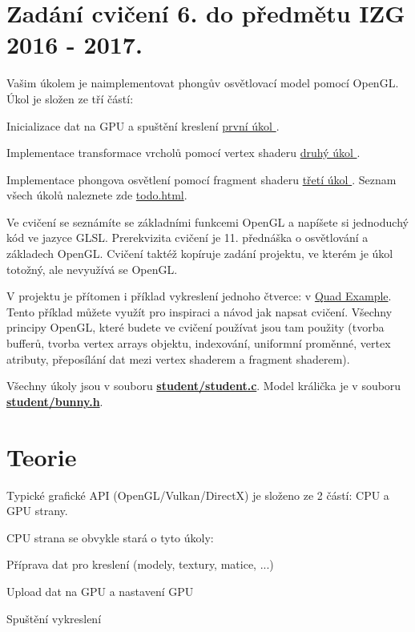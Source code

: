 \hypertarget{index_zadani}{}\section{Zadání cvičení 6. do předmětu I\-Z\-G 2016 -\/ 2017.}\label{index_zadani}
Vašim úkolem je naimplementovat phongův osvětlovací model pomocí Open\-G\-L. Úkol je složen ze tří částí\-:
\begin{DoxyItemize}
\item Inicializace dat na G\-P\-U a spuštění kreslení \hyperlink{group__task1}{první úkol }. 
\item Implementace transformace vrcholů pomocí vertex shaderu \hyperlink{group__task2}{druhý úkol }. 
\item Implementace phongova osvětlení pomocí fragment shaderu \hyperlink{group__task3}{třetí úkol }.  Seznam všech úkolů naleznete zde \hyperlink{todo}{todo.\-html}.
\end{DoxyItemize}

Ve cvičení se seznámíte se základními funkcemi Open\-G\-L a napíšete si jednoduchý kód ve jazyce G\-L\-S\-L. Prerekvizita cvičení je 11. přednáška o osvětlování a základech Open\-G\-L. Cvičení taktéž kopíruje zadání projektu, ve kterém je úkol totožný, ale nevyužívá se Open\-G\-L.

V projektu je přítomen i příklad vykreslení jednoho čtverce\-: v \hyperlink{}{Quad Example}. Tento příklad můžete využít pro inspiraci a návod jak napsat cvičení. Všechny principy Open\-G\-L, které budete ve cvičení používat jsou tam použity (tvorba bufferů, tvorba vertex arrays objektu, indexování, uniformní proměnné, vertex atributy, přeposílání dat mezi vertex shaderem a fragment shaderem).

Všechny úkoly jsou v souboru {\bfseries \hyperlink{student_8c}{student/student.\-c}}. Model králička je v souboru {\bfseries \hyperlink{bunny_8h}{student/bunny.\-h}}.\hypertarget{index_teorie}{}\section{Teorie}\label{index_teorie}
Typické grafické A\-P\-I (Open\-G\-L/\-Vulkan/\-Direct\-X) je složeno ze 2 částí\-: C\-P\-U a G\-P\-U strany.

C\-P\-U strana se obvykle stará o tyto úkoly\-:
\begin{DoxyItemize}
\item Příprava dat pro kreslení (modely, textury, matice, ...)
\item Upload dat na G\-P\-U a nastavení G\-P\-U
\item Spuštění vykreslení
\end{DoxyItemize}

